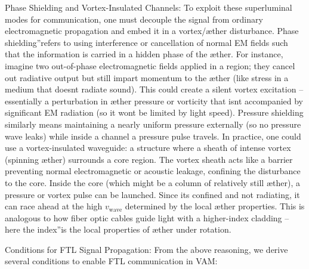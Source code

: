 Phase Shielding and Vortex-Insulated Channels: To exploit these superluminal modes for communication, one must decouple the signal from ordinary electromagnetic propagation and embed it in a vortex/æther disturbance. \grqq Phase shielding\textquotedblright refers to using interference or cancellation of normal EM fields such that the information is carried in a hidden phase of the æther. For instance, imagine two out-of-phase electromagnetic fields applied in a region; they cancel out radiative output but still impart momentum to the æther (like stress in a medium that doesn\rqs t radiate sound). This could create a silent vortex excitation – essentially a perturbation in æther pressure or vorticity that isn\rqs t accompanied by significant EM radiation (so it won\rqs t be limited by light speed). Pressure shielding similarly means maintaining a nearly uniform pressure externally (so no pressure wave leaks) while inside a channel a pressure pulse travels. In practice, one could use a vortex-insulated waveguide: a structure where a sheath of intense vortex (spinning æther) surrounds a core region. The vortex sheath acts like a barrier preventing normal electromagnetic or acoustic leakage, confining the disturbance to the core. Inside the core (which might be a column of relatively still æther), a pressure or vortex pulse can be launched. Since it\rqs s confined and not radiating, it can race ahead at the high $v_\text{wave}$ determined by the local æther properties. This is analogous to how fiber optic cables guide light with a higher-index cladding – here the \grqq index\textquotedblright is the local properties of æther under rotation.


Conditions for FTL Signal Propagation: From the above reasoning, we derive several conditions to enable FTL communication in VAM:


